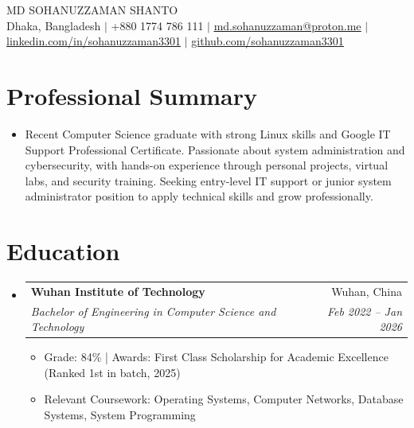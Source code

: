 \documentclass[letterpaper,11pt]{article}
\makeatletter
\newcommand{\resumeItem}[1]{
  \item\small{
    {#1 \vspace{-2pt}}
  }
}
\newcommand{\resumeSubheading}[4]{
  \vspace{-2pt}\item
    \begin{tabular*}{0.97\textwidth}[t]{l@{\extracolsep{\fill}}r}
      \textbf{#1} & #2 \\
      \textit{\small#3} & \textit{\small #4} \\
    \end{tabular*}\vspace{-7pt}
}
\newcommand{\resumeSubHeadingListStart}{\begin{itemize}[leftmargin=0.15in, label={}]}
\newcommand{\resumeSubHeadingListEnd}{\end{itemize}}
\newcommand{\resumeItemListStart}{\begin{itemize}}
\newcommand{\resumeItemListEnd}{\end{itemize}\vspace{-5pt}}
\makeatother
\begin{document}
\begin{center}
    {\Huge \textsc{MD SOHANUZZAMAN SHANTO}} \\
    \vspace{6pt}
    {\small Dhaka, Bangladesh $|$ +880 1774 786 111 $|$ \href{mailto:md.sohanuzzaman@proton.me}{\underline{md.sohanuzzaman@proton.me}} $|$ \href{https://linkedin.com/in/sohanuzzaman3301}{\underline{linkedin.com/in/sohanuzzaman3301}} $|$ \href{https://github.com/sohanuzzaman3301}{\underline{github.com/sohanuzzaman3301}}}
\end{center}

\section{Professional Summary}
\resumeSubHeadingListStart
\resumeItem{Recent Computer Science graduate with strong Linux skills and Google IT Support Professional Certificate. Passionate about system administration and cybersecurity, with hands-on experience through personal projects, virtual labs, and security training. Seeking entry-level IT support or junior system administrator position to apply technical skills and grow professionally.}
\resumeSubHeadingListEnd

\section{Education}
\resumeSubHeadingListStart
\resumeSubheading
{Wuhan Institute of Technology}{Wuhan, China}
{Bachelor of Engineering in Computer Science and Technology}{Feb 2022 -- Jan 2026}
\resumeItemListStart
\resumeItem{Grade: 84\% | Awards: First Class Scholarship for Academic Excellence (Ranked 1st in batch, 2025)}
\resumeItem{Relevant Coursework: Operating Systems, Computer Networks, Database Systems, System Programming}
\resumeItemListEnd
\resumeSubHeadingListEnd

\end{document}
